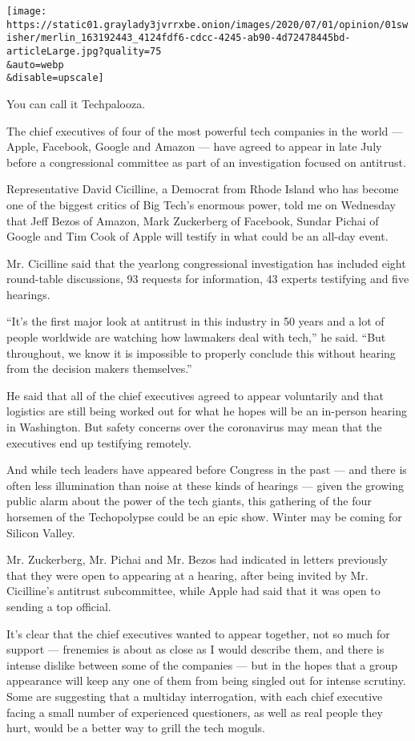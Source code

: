 \texttt{[image: https://static01.graylady3jvrrxbe.onion/images/2020/07/01/opinion/01swisher/merlin\_163192443\_4124fdf6-cdcc-4245-ab90-4d72478445bd-articleLarge.jpg?quality=75\\\&auto=webp\\\&disable=upscale]}

You can call it Techpalooza.

The chief executives of four of the most powerful tech companies in the
world --- Apple, Facebook, Google and Amazon --- have agreed to appear
in late July before a congressional committee as part of an
investigation focused on antitrust.

Representative David Cicilline, a Democrat from Rhode Island who has
become one of the biggest critics of Big Tech's enormous power, told me
on Wednesday that Jeff Bezos of Amazon, Mark Zuckerberg of Facebook,
Sundar Pichai of Google and Tim Cook of Apple will testify in what could
be an all-day event.

Mr. Cicilline said that the yearlong congressional investigation has
included eight round-table discussions, 93 requests for information, 43
experts testifying and five hearings.

``It's the first major look at antitrust in this industry in 50 years
and a lot of people worldwide are watching how lawmakers deal with
tech,'' he said. ``But throughout, we know it is impossible to properly
conclude this without hearing from the decision makers themselves.''

He said that all of the chief executives agreed to appear voluntarily
and that logistics are still being worked out for what he hopes will be
an in-person hearing in Washington. But safety concerns over the
coronavirus may mean that the executives end up testifying remotely.

And while tech leaders have appeared before Congress in the past --- and
there is often less illumination than noise at these kinds of hearings
--- given the growing public alarm about the power of the tech giants,
this gathering of the four horsemen of the Techopolypse could be an epic
show. Winter may be coming for Silicon Valley.

Mr. Zuckerberg, Mr. Pichai and Mr. Bezos had indicated in letters
previously that they were open to appearing at a hearing, after being
invited by Mr. Cicilline's antitrust subcommittee, while Apple had said
that it was open to sending a top official.

It's clear that the chief executives wanted to appear together, not so
much for support --- frenemies is about as close as I would describe
them, and there is intense dislike between some of the companies --- but
in the hopes that a group appearance will keep any one of them from
being singled out for intense scrutiny. Some are suggesting that a
multiday interrogation, with each chief executive facing a small number
of experienced questioners, as well as real people they hurt, would be a
better way to grill the tech moguls.

